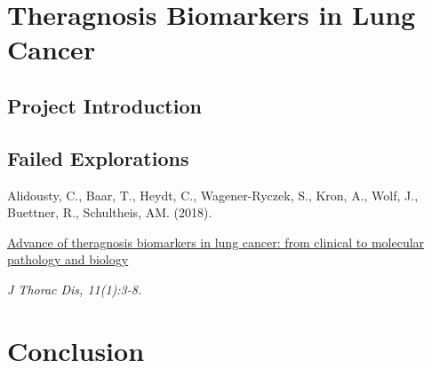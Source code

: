 
\chapter{Theragnosis Biomarkers in Lung Cancer}

\section{Project Introduction}

\section{Failed Explorations}

\begin{tcolorbox}[
  boxrule=0pt, leftrule=1pt, colframe=s-blue, colback=white, sharp corners=all]%
  \raggedright
  Alidousty, C., Baar, T., Heydt, C., Wagener-Ryczek, S., Kron, A., Wolf, J.,
  Buettner, R., Schultheis, AM. (2018).
  
  \smallskip
  \href{http://jtd.amegroups.com/article/view/25843}
    {Advance of theragnosis biomarkers in lung cancer: from clinical to
    molecular pathology and biology}

  \smallskip
  \textit{J Thorac Dis, 11(1):3-8.}
\end{tcolorbox}


\chapter{Conclusion}


